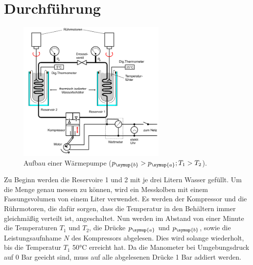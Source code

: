 \section{Durchführung}
\label{sec:Durchführung}
\begin{figure}
  \centering
  \includegraphics[width=0.65\textwidth]{messapparatur.png}
  \caption{Aufbau einer Wärmepumpe ($p_\symup{b} > p_\symup{a}; T_1 > T_2$).}
  \label{fig:aufbau}
\end{figure}
Zu Beginn werden die Reservoire 1 und 2 mit je drei Litern Wasser gefüllt. Um die
Menge genau messen zu können, wird ein Messkolben mit einem Fassungsvolumen von
einem Liter verwendet.
Es werden der Kompressor und die Rührmotoren, die dafür sorgen, dass die Temperatur in
den Behältern immer gleichmäßig verteilt ist, angeschaltet.
Nun werden im Abstand von einer Minute die Temperaturen $T_1$ und $T_2$, die Drücke
$p_\symup{a}$ und $p_\symup{b}$, sowie die Leistungsaufnhame $N$ des Kompressors
abgelesen. Dies wird solange wiederholt, bis die Temperatur $T_1$ 50°C erreicht hat.
Da die Manometer bei Umgebungsdruck auf 0 Bar geeicht sind, muss auf alle abgelesenen
Drücke 1 Bar addiert werden.
